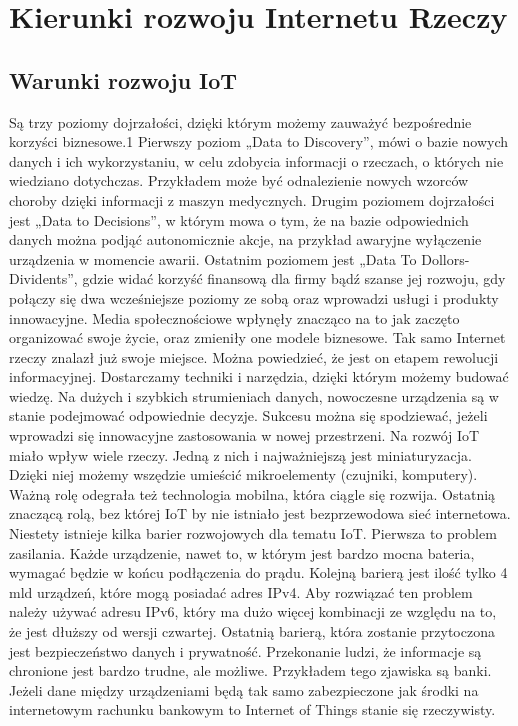 \documentclass[brudnopis]{xmgr}
\begin{document}
\chapter{Kierunki rozwoju Internetu Rzeczy}

\section{Warunki rozwoju IoT}

Są trzy poziomy dojrzałości, dzięki którym możemy zauważyć bezpośrednie korzyści biznesowe.1
Pierwszy poziom „Data to Discovery”, mówi o bazie nowych danych i ich wykorzystaniu, w celu  zdobycia informacji o rzeczach, o których nie wiedziano dotychczas. Przykładem może być odnalezienie nowych wzorców choroby dzięki informacji z maszyn medycznych. 
Drugim poziomem dojrzałości jest „Data to Decisions”, w którym mowa o tym, że na bazie odpowiednich danych można podjąć autonomicznie akcje, na przykład awaryjne wyłączenie urządzenia w momencie awarii. 
Ostatnim poziomem jest „Data To Dollors-Dividents”, gdzie widać korzyść finansową dla firmy bądź szanse jej rozwoju, gdy połączy się dwa wcześniejsze poziomy ze sobą oraz wprowadzi usługi i produkty innowacyjne. 
Media społecznościowe wpłynęły znacząco na to jak zaczęto organizować swoje życie, oraz zmieniły one modele biznesowe. Tak samo Internet rzeczy znalazł już swoje miejsce. Można powiedzieć, że jest on etapem rewolucji informacyjnej. Dostarczamy techniki i narzędzia, dzięki którym możemy budować wiedzę. Na dużych i szybkich strumieniach danych, nowoczesne urządzenia są w stanie podejmować odpowiednie decyzje. Sukcesu można się spodziewać, jeżeli wprowadzi się innowacyjne zastosowania w nowej przestrzeni. 
Na rozwój IoT miało wpływ wiele rzeczy. Jedną z nich i najważniejszą jest miniaturyzacja. Dzięki niej możemy wszędzie umieścić mikroelementy (czujniki, komputery). Ważną rolę odegrała też technologia mobilna, która ciągle się rozwija. Ostatnią znaczącą rolą, bez której IoT by nie istniało jest bezprzewodowa sieć internetowa. 
Niestety istnieje kilka barier rozwojowych dla tematu IoT. Pierwsza to problem zasilania. Każde urządzenie, nawet to, w którym jest bardzo mocna bateria, wymagać będzie w końcu podłączenia do prądu. Kolejną barierą jest ilość tylko 4 mld urządzeń, które mogą posiadać adres IPv4. Aby rozwiązać ten problem należy używać adresu IPv6, który ma dużo więcej kombinacji ze względu na to, że jest dłuższy od wersji czwartej. Ostatnią barierą, która zostanie przytoczona jest bezpieczeństwo danych i prywatność. Przekonanie ludzi, że informacje są chronione jest bardzo trudne, ale możliwe. Przykładem tego zjawiska są banki. Jeżeli dane między urządzeniami będą tak samo zabezpieczone jak środki na internetowym rachunku bankowym to Internet of Things stanie się rzeczywisty. 
\end{document}

